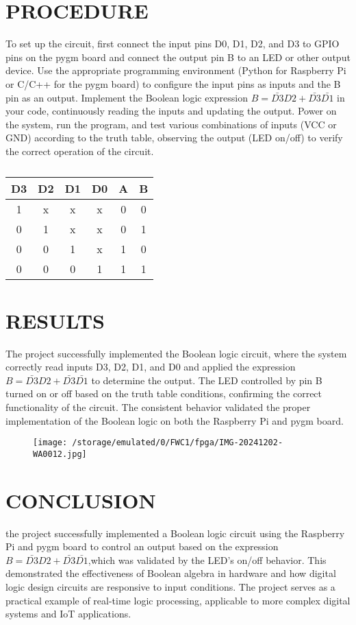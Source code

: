 \documentclass[conference]{IEEEtran}
\begin{document}
\section{PROCEDURE}
To set up the circuit, first connect the input pins D0, D1, D2, and D3 to GPIO pins on the pygm board and connect the output pin B to an LED or other output device. Use the appropriate programming environment (Python for Raspberry Pi or C/C++ for the pygm board) to configure the input pins as inputs and the B pin as an output. Implement the Boolean logic expression $B={\bar{D3}}D2+{\bar{D3}} {\bar{D1}}$ in your code, continuously reading the inputs and updating the output. Power on the system, run the program, and test various combinations of inputs (VCC or GND) according to the truth table, observing the output (LED on/off) to verify the correct operation of the circuit.
\begin{table} [htbp]
\centering
\begin{tabular}{| c | c | c | c | c | c |} \hline
D3& D2& D1& D0& A & B  \\\hline
1 & x & x & x & 0 & 0\\ \hline
0 & 1 & x & x & 0 & 1\\ \hline
0 & 0 & 1 & x & 1 & 0\\ \hline
0 & 0 & 0 & 1 & 1 & 1 \\ \hline

\end{tabular}
\vspace{0.2cm}
\caption{\label{tab:widgets}}
\end{table}

\section{RESULTS}
The project successfully implemented the Boolean logic circuit, where the system correctly read inputs D3, D2, D1, and D0 and applied the expression $B={\bar{D3}}D2+{\bar{D3}} {\bar{D1}}$ to determine the output. The LED controlled by pin B turned on or off based on the truth table conditions, confirming the correct functionality of the circuit. The consistent behavior validated the proper implementation of the Boolean logic on both the Raspberry Pi and pygm board.


\begin{figure}[h]
\texttt{[image: /storage/emulated/0/FWC1/fpga/IMG-20241202-WA0012.jpg]}
\end{figure}


\section{CONCLUSION}
 the project successfully implemented a Boolean logic circuit using the Raspberry Pi and pygm board to control an output based on the expression $B={\bar{D3}}D2+{\bar{D3}} {\bar{D1}}$,which was validated by the LED's on/off behavior. This demonstrated the effectiveness of Boolean algebra in hardware and how digital logic design circuits are responsive to input conditions. The project serves as a practical example of real-time logic processing, applicable to more complex digital systems and IoT applications.
\end{document}
